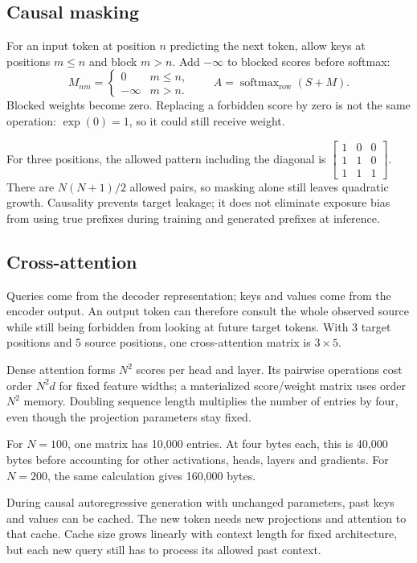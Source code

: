\documentclass[11pt]{article}
\begin{document}
\subsection{Causal masking}
For an input token at position $n$ predicting the next token, allow keys at positions $m\leq n$ and block $m>n$. Add $-\infty$ to blocked scores before softmax:
\[
M_{nm}=\begin{cases}0&m\leq n,\\-\infty&m>n.\end{cases}
\qquad A=\operatorname{softmax}_{\mathrm{row}}(S+M).
\]
Blocked weights become zero. Replacing a forbidden score by zero is not the same operation: $\exp(0)=1$, so it could still receive weight.

For three positions, the allowed pattern including the diagonal is
$\left[\begin{smallmatrix}1&0&0\\1&1&0\\1&1&1\end{smallmatrix}\right]$.
There are $N(N+1)/2$ allowed pairs, so masking alone still leaves quadratic growth. Causality prevents target leakage; it does not eliminate exposure bias from using true prefixes during training and generated prefixes at inference.

\subsection{Cross-attention}
Queries come from the decoder representation; keys and values come from the encoder output. An output token can therefore consult the whole observed source while still being forbidden from looking at future target tokens. With 3 target positions and 5 source positions, one cross-attention matrix is $3\times5$.

Dense attention forms $N^2$ scores per head and layer. Its pairwise operations cost order $N^2d$ for fixed feature widths; a materialized score/weight matrix uses order $N^2$ memory. Doubling sequence length multiplies the number of entries by four, even though the projection parameters stay fixed.

For $N=100$, one matrix has 10,000 entries. At four bytes each, this is 40,000 bytes before accounting for other activations, heads, layers and gradients. For $N=200$, the same calculation gives 160,000 bytes.

During causal autoregressive generation with unchanged parameters, past keys and values can be cached. The new token needs new projections and attention to that cache. Cache size grows linearly with context length for fixed architecture, but each new query still has to process its allowed past context.
\end{document}

